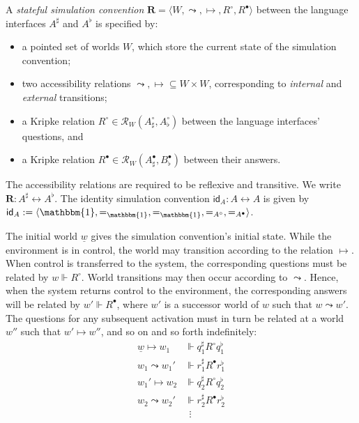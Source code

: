 \documentclass[acmsmall,screen,review,anonymous]{acmart}
\newcommand{\kw}[1]{\ensuremath{ \mathsf{#1} }}
\newcommand{\que}{\circ}
\newcommand{\ans}{\bullet}
\newcommand{\intl}[1]{\underline{#1}}
\begin{document}
\begin{definition} \label{def:sconv} %
A \emph{stateful simulation convention}
$\mathbf{R} = \langle W, {\leadsto}, {\mapsto}, R^\que, R^\ans \rangle$
between the language interfaces $A^\sharp$ and $A^\flat$
is specified by:
\begin{itemize}
  \item a pointed set of worlds $W$,
    which store the current state of the simulation convention;
  \item two accessibility relations
    ${\leadsto}, {\mapsto} \subseteq W \times W$,
    corresponding to \emph{internal} and \emph{external} transitions;
  \item a Kripke relation $R^\que \in \mathcal{R}_W(A_\sharp^\que, A_\flat^\que)$
    between the language interfaces' questions, and
  \item a Kripke relation $R^\ans \in \mathcal{R}_W(A_\sharp^\ans, B_\flat^\ans)$
    between their answers.
\end{itemize}
The accessibility relations are required to be reflexive and transitive.
We write $\mathbf{R} : A^\sharp \leftrightarrow A^\flat$.
The identity simulation convention
$\kw{id}_A : A \leftrightarrow A$
is given by
$\kw{id}_A := \langle
    \mathbbm{1}, {=}_\mathbbm{1}, {=}_\mathbbm{1}, {=}_{A^\que}, {=}_{A^\ans}
 \rangle$.
\end{definition}

The initial world $\intl{w}$ gives the simulation convention's initial state.
While the environment is in control,
the world may transition according to the relation $\mapsto$.
When control is transferred to the system,
the corresponding questions must be related by $w \Vdash R^\que$.
World transitions may then occur according to $\leadsto$.
Hence, when the system returns control to the environment,
the corresponding answers
will be related by $w' \Vdash R^\ans$,
where $w'$ is a successor world of $w$ such that $w \leadsto w'$.
The questions for any subsequent activation
must in turn be related at a world $w''$ such that $w' \mapsto w''$,
and so on and so forth indefinitely:
\begin{align*}
  \intl{w} \mapsto w_1 &\Vdash q^\sharp_1 \mathrel{R^\que} q^\flat_1 \\
  w_1 \leadsto w_1' &\Vdash r^\sharp_1 \mathrel{R^\ans} r^\flat_1 \\
  w_1' \mapsto w_2 &\Vdash q^\sharp_2 \mathrel{R^\que} q^\flat_2 \\
  w_2 \leadsto w_2' &\Vdash r^\sharp_2 \mathrel{R^\ans} r^\flat_2 \\[-1ex]
  &\:\:\vdots
\end{align*}
\end{document}
